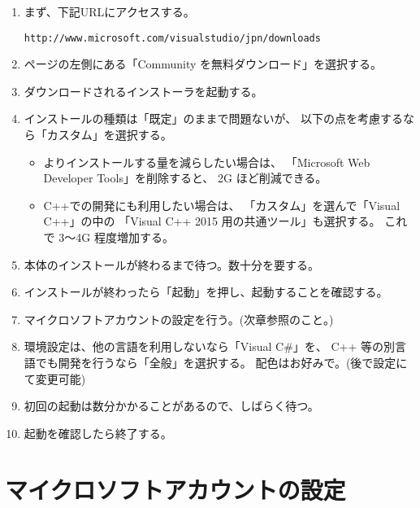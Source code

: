\documentclass[a4paper]{jsarticle}
\begin{document}
\begin{enumerate}
 \item まず、下記URLにアクセスする。
  \begin{screen}
  \begin{center}
	\verb+http://www.microsoft.com/visualstudio/jpn/downloads+
  \end{center}
  \end{screen}

 \item ページの左側にある「Community を無料ダウンロード」を選択する。

 \item ダウンロードされるインストーラを起動する。

 \item インストールの種類は「既定」のままで問題ないが、
	以下の点を考慮するなら「カスタム」を選択する。
	\begin{itemize}
	\item よりインストールする量を減らしたい場合は、
		「Microsoft Web Developer Tools」を削除すると、
		2G ほど削減できる。

	\item C++での開発にも利用したい場合は、
		「カスタム」を選んで「Visual C++」の中の
		「Visual C++ 2015 用の共通ツール」も選択する。
		これで 3〜4G 程度増加する。
	\end{itemize}	
 \item 本体のインストールが終わるまで待つ。数十分を要する。

 \item インストールが終わったら「起動」を押し、起動することを確認する。

 \item マイクロソフトアカウントの設定を行う。(次章参照のこと。)

 \item 環境設定は、他の言語を利用しないなら「Visual C\#」を、
	C++ 等の別言語でも開発を行うなら「全般」を選択する。
	配色はお好みで。(後で設定にて変更可能)

 \item 初回の起動は数分かかることがあるので、しばらく待つ。

 \item 起動を確認したら終了する。

\end{enumerate}

\section{マイクロソフトアカウントの設定}
\end{document}
